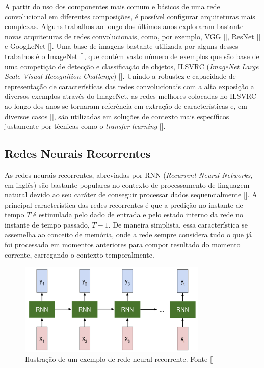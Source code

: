 A partir do uso dos componentes mais comum e básicos de uma rede convolucional em diferentes composições, é possível configurar arquiteturas mais complexas. 
Alguns trabalhos ao longo dos últimos anos exploraram bastante novas arquiteturas de redes convolucionais, como, por exemplo, VGG [], 
ResNet [] e GoogLeNet []. Uma base de imagens bastante utilizada por alguns desses trabalhos é o ImageNet 
[], que contém vasto número de exemplos que são base de uma competição de detecção e classificação de objetos, ILSVRC 
(\textit{ImageNet Large Scale Visual Recognition Challenge}) []. Unindo a robustez e capacidade de representação de características das 
redes convolucionais com a alta exposição a diversos exemplos através do ImageNet, as redes melhores colocadas no ILSVRC ao longo dos anos se tornaram 
referência em extração de características e, em diversos casos [], são utilizadas em soluções de contexto mais específicos justamente 
por técnicas como o \textit{transfer-learning} [].


\subsection{Redes Neurais Recorrentes}
As redes neurais recorrentes, abreviadas por RNN (\textit{Recurrent Neural Networks}, em inglês) são bastante populares no contexto de processamento de 
linguagem natural devido ao seu caráter de conseguir processar dados sequencialmente []. A principal característica das redes recorrentes 
é que a predição no instante de tempo $T$ é estimulada pelo dado de entrada e pelo estado interno da rede no instante de tempo passado, $T - 1$. De maneira 
simplista, essa característica se assemelha ao conceito de memória, onde a rede sempre considera tudo o que já foi processado em momentos anteriores para 
compor resultado do momento corrente, carregando o contexto temporalmente.

\begin{figure}
    \centering
    \includegraphics[width=0.8\textwidth]{figs/theory-example-rnn.png}
    \caption{Ilustração de um exemplo de rede neural recorrente. Fonte []}
    \label{fig:theory-rnn-example}
\end{figure}

